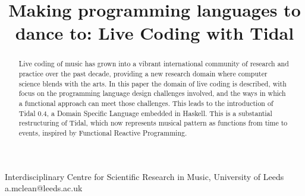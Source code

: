\documentclass[authoryear,preprint]{sigplanconf}
\begin{document}
\setlength{\pdfpageheight}{\paperheight}
\setlength{\pdfpagewidth}{\paperwidth}







\title{Making programming languages to dance to: Live Coding with Tidal}

           {Interdisciplinary Centre for Scientific Research in Music, University of Leeds}
           {a.mclean@leeds.ac.uk}

\maketitle

\begin{abstract}

Live coding of music has grown into a vibrant international community
of research and practice over the past decade, providing a new
research domain where computer science blends with the arts. In this
paper the domain of live coding is described, with focus on the
programming language design challenges involved, and the ways in which
a functional approach can meet those challenges. This leads to the
introduction of Tidal 0.4, a Domain Specific Language embedded in
Haskell. This is a substantial restructuring of Tidal, which now
represents musical pattern as functions from time to events, inspired
by Functional Reactive Programming.

\end{abstract}

\end{document}
